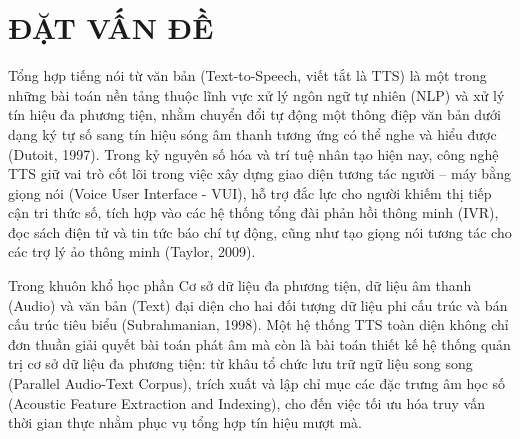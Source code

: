 \section{ĐẶT VẤN ĐỀ}

Tổng hợp tiếng nói từ văn bản (Text-to-Speech, viết tắt là TTS) là một trong những bài toán nền tảng thuộc lĩnh vực xử lý ngôn ngữ tự nhiên (NLP) và xử lý tín hiệu đa phương tiện, nhằm chuyển đổi tự động một thông điệp văn bản dưới dạng ký tự số sang tín hiệu sóng âm thanh tương ứng có thể nghe và hiểu được (Dutoit, 1997). Trong kỷ nguyên số hóa và trí tuệ nhân tạo hiện nay, công nghệ TTS giữ vai trò cốt lõi trong việc xây dựng giao diện tương tác người -- máy bằng giọng nói (Voice User Interface - VUI), hỗ trợ đắc lực cho người khiếm thị tiếp cận tri thức số, tích hợp vào các hệ thống tổng đài phản hồi thông minh (IVR), đọc sách điện tử và tin tức báo chí tự động, cũng như tạo giọng nói tương tác cho các trợ lý ảo thông minh (Taylor, 2009).

Trong khuôn khổ học phần Cơ sở dữ liệu đa phương tiện, dữ liệu âm thanh (Audio) và văn bản (Text) đại diện cho hai đối tượng dữ liệu phi cấu trúc và bán cấu trúc tiêu biểu (Subrahmanian, 1998). Một hệ thống TTS toàn diện không chỉ đơn thuần giải quyết bài toán phát âm mà còn là bài toán thiết kế hệ thống quản trị cơ sở dữ liệu đa phương tiện: từ khâu tổ chức lưu trữ ngữ liệu song song (Parallel Audio-Text Corpus), trích xuất và lập chỉ mục các đặc trưng âm học số (Acoustic Feature Extraction and Indexing), cho đến việc tối ưu hóa truy vấn thời gian thực nhằm phục vụ tổng hợp tín hiệu mượt mà.

